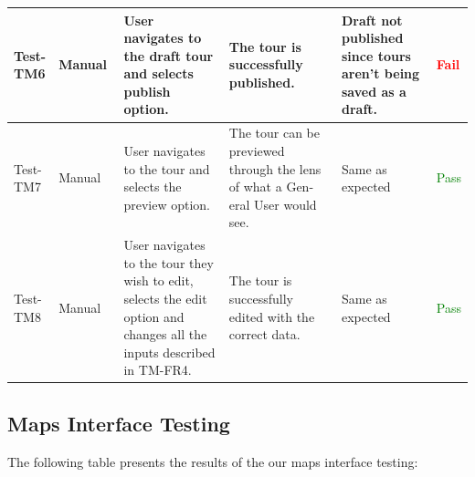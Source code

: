 \documentclass[12pt, titlepage]{article}
\begin{document}
\begin{table}[H]
{\begin{tabular}{|l|p{0.15\linewidth}|p{0.3\linewidth}|p{0.3\linewidth}|p{0.3\linewidth}|p{0.1\linewidth}|}
        \hline
      Test-TM6                           & Manual                            & User navigates to the draft tour and selects publish option. & The tour is successfully published.                        & Draft not published since tours aren't being saved as a draft.                               & \textcolor{Red}{Fail}               \\
      \hline
    Test-TM7                           & Manual                            & User navigates to the tour and selects the preview option. & The tour can be previewed through the lens of what a Gen-
eral User would see.                        & Same as expected                             & \textcolor{Green}{Pass}               \\
      \hline
      Test-TM8                           & Manual                            & User navigates to the tour they wish to edit, selects the edit
option and changes all the inputs described in TM-FR4. & The tour is successfully edited with the correct data.                     & Same as expected                             & \textcolor{Green}{Pass}               \\
      \hline
    \end{tabular}}
  \label{table:GR5}
\end{table}

\subsection{Maps Interface Testing}
The following table presents the results of the our maps interface testing:
\end{document}

